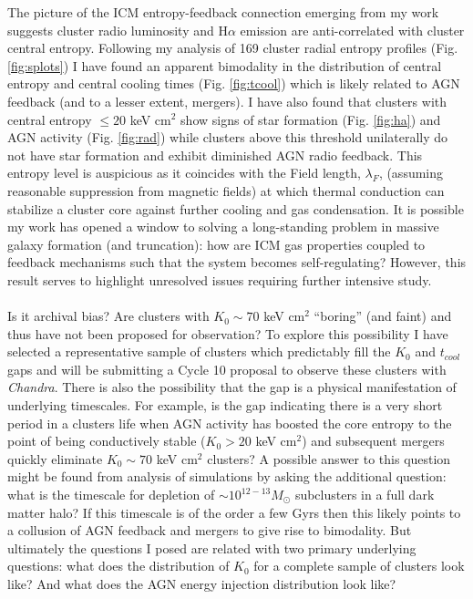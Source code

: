 \documentclass[11pt]{article}
\begin{document}
The picture of the ICM entropy-feedback connection emerging from my
work suggests cluster radio luminosity and H$\alpha$ emission are
anti-correlated with cluster central entropy. Following my analysis of 169
cluster radial entropy profiles (Fig. \ref{fig:splots}) I have found
an apparent bimodality in the distribution of central
entropy and central cooling times (Fig. \ref{fig:tcool}) which is
likely related to AGN feedback (and to a lesser extent, mergers). I
have also found that clusters with central entropy $\leq 20$ keV
cm$^2$ show signs of star formation (Fig. \ref{fig:ha}) and AGN
activity (Fig. \ref{fig:rad}) while clusters above this threshold
unilaterally do not have star formation and exhibit diminished AGN
radio feedback. This entropy level is auspicious as it coincides with
the Field length, $\lambda_F$, (assuming reasonable suppression from
magnetic fields) at which thermal conduction can stabilize a cluster
core against further cooling and gas condensation. It is possible my
work has opened a window to solving a long-standing problem in massive
galaxy formation (and truncation): how are ICM gas properties coupled
to feedback mechanisms such that the system becomes self-regulating?
However, this result serves to highlight unresolved issues requiring
further intensive study.\\

\\
Is it archival bias? Are clusters with $K_0 \sim 70$ keV
cm$^2$ ``boring'' (and faint) and thus have not been
proposed for observation? To explore this possibility I have selected a
representative sample of clusters which predictably fill the $K_0$ and
$t_{cool}$ gaps and will be submitting a Cycle 10 proposal to observe
these clusters with {\it Chandra}. There is also the possibility that
the gap is a physical manifestation of underlying timescales. For
example, is the gap indicating there is a very short period in a
clusters life when AGN activity has boosted the core entropy to the
point of being conductively stable ($K_0 > 20$ keV cm$^2$) and
subsequent mergers quickly eliminate $K_0 \sim 70$ keV cm$^2$ clusters? A
possible answer to this question might be found from analysis of
simulations by asking the additional question: what is the timescale
for depletion of $\sim 10^{12-13} M_{\odot}$ subclusters in a full
dark matter halo? If this timescale is of the order a few Gyrs then
this likely points to a collusion of AGN feedback and mergers to give
rise to bimodality. But ultimately the questions I posed are related
with two primary underlying questions: what does the distribution of
$K_0$ for a complete sample of clusters look like? And what does the
AGN energy injection distribution look like?\\
\end{document}
